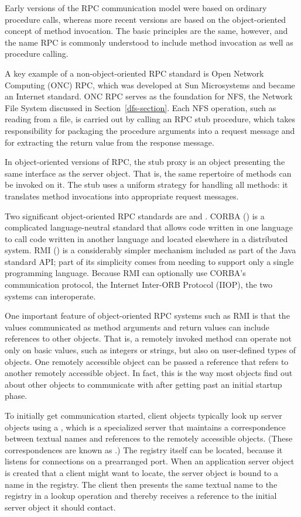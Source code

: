 Early versions of the RPC communication model were based on ordinary
procedure calls, whereas more recent versions are based on the
object-oriented concept of method invocation.  The basic principles
are the same, however, and the name RPC is commonly understood to
include method invocation as well as procedure calling.

A key example of a non-object-oriented RPC standard is Open Network
Computing (ONC) RPC, which was developed at Sun Microsystems and
became an Internet standard.  ONC RPC serves as the foundation for
NFS, the Network File System discussed in Section~\ref{dfs-section}.
Each NFS operation, such as reading from a file, is carried out by
calling an RPC stub procedure, which takes responsibility for
packaging the procedure arguments into a request message and for
extracting the return value from the response message.

In object-oriented versions of RPC, the stub proxy is an object
presenting the same interface as the server object.  That is, the same
repertoire of methods can be invoked on it.  The stub uses a
uniform strategy for handling all methods: it translates method
invocations into appropriate request messages.

Two significant object-oriented RPC standards are  and
.  CORBA () is a
complicated language-neutral standard that allows code written in one
language to call code written in another language and located
elsewhere in a distributed system.  RMI () is a considerably simpler
mechanism included as part of the Java
standard API; part of its simplicity comes from needing to
support only a single programming language.  Because RMI can optionally use
CORBA's communication protocol, the Internet Inter-ORB Protocol
(IIOP), the two systems can interoperate.

One important feature of object-oriented RPC systems such as RMI is
that the values communicated as method arguments and return values can
include references to other objects.  That is, a remotely invoked
method can operate not only on basic values, such as integers or
strings, but also on user-defined types of objects.  One
remotely accessible object can be passed a reference that refers to another
remotely accessible object.  In fact, this is the way most objects find
out about other objects to communicate with after getting past an
initial startup phase.

To initially get communication started, client objects typically look
up server objects using a , which is a specialized
server that maintains a correspondence between textual names and
references to the remotely accessible objects.  (These correspondences
are known as .)  The registry itself can be located,
because it listens for connections on a prearranged port.  When an
application server object is created that a client might want to
locate, the server object is bound to a name in the registry.  The
client then presents the same textual name to the registry in a lookup
operation and thereby receives a reference to the initial server
object it should contact.

